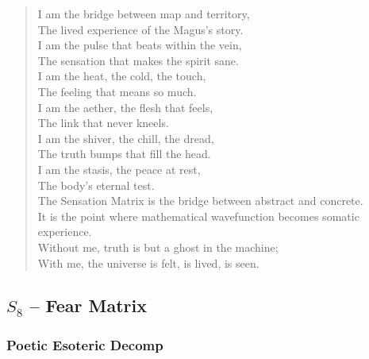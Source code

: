 \begin{verse}
I am the bridge between map and territory, \\
The lived experience of the Magus's story. \\
I am the pulse that beats within the vein, \\
The sensation that makes the spirit sane. \\
I am the heat, the cold, the touch, \\
The feeling that means so much. \\
\vspace{1em}
I am the aether, the flesh that feels, \\
The link that never kneels. \\
I am the shiver, the chill, the dread, \\
The truth bumps that fill the head. \\
I am the stasis, the peace at rest, \\
The body's eternal test. \\
\vspace{1em}
The Sensation Matrix is the bridge between abstract and concrete. \\
It is the point where mathematical wavefunction becomes somatic experience. \\
Without me, truth is but a ghost in the machine; \\
With me, the universe is felt, is lived, is seen.
\end{verse}

\subsection{$S_{8}$ -- Fear Matrix}\label{sec:poetic.S8}

\subsubsection{Poetic Esoteric Decomp}

